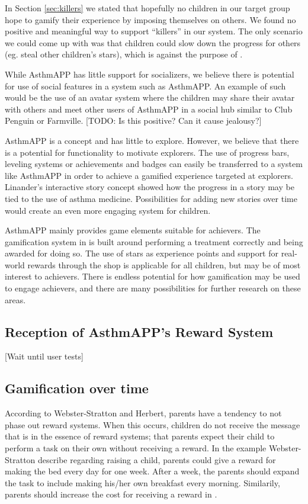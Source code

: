 In Section \ref{sec:killers} we stated that hopefully no children in our target group hope to gamify their experience by imposing themselves on others. We found no positive and meaningful way to support ``killers'' in our system. The only scenario we could come up with was that children could slow down the progress for others (eg. steal other children's stars), which is against the purpose of \app{}.  

While AsthmAPP has little support for socializers, we believe there is potential for use of social features in a system such as AsthmAPP. An example of such would be the use of an avatar system where the children may share their avatar with others and meet other users of AsthmAPP in a social hub similar to Club Penguin or Farmville. 
[TODO: Is this positive? Can it cause jealousy?]

AsthmAPP is a concept and has little to explore. However, we believe that there is a potential for functionality to motivate explorers. The use of progress bars, leveling systems or achievements and badges can easily be transferred to a system like AsthmAPP in order to achieve a gamified experience targeted at explorers. Linander's interactive story concept showed how the progress in a story may be tied to the use of asthma medicine\cite{linander2013utvikling}. Possibilities for adding new stories over time would create an even more engaging system for children. 

AsthmAPP mainly provides game elements suitable for achievers. The gamification system in \app{} is built around performing a treatment correctly and being awarded for doing so. The use of stars as experience points and support for real-world rewards through the shop is applicable for all children, but may be of most interest to achievers. There is endless potential for how gamification may be used to engage achievers, and there are many possibilities for further research on these areas. 


\subsection{Reception of AsthmAPP's Reward System}
\label{sec:receptionofrewardsystem}
[Wait until user tests]


\subsection{Gamification over time}
\label{sec:gamificationovertime}
According to Webster-Stratton and Herbert, parents have a tendency to not phase out reward systems\cite{webster1994troubled}. When this occurs, children do not receive the message that is in the essence of reward systems; that parents expect their child to perform a task on their own without receiving a reward. In the example Webster-Stratton \etal{} describe regarding raising a child, parents could give a reward for making the bed every day for one week. After a week, the parents should expand the task to include making his/her own breakfast every morning. Similarily, parents should increase the cost for receiving a reward in \app{}.  

